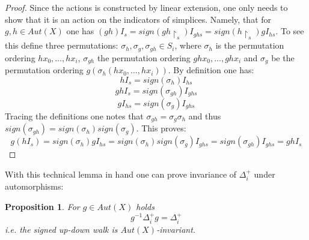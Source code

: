 \documentclass[11pt]{amsart}
\newtheorem{proposition}[theorem]{Proposition}
\begin{document}
    \begin{proof}
        Since the actions is constructed by linear extension, one only needs to show that it is an action on the indicators of simplices. Namely, that for $g,h\in Aut(X)$ one has $(gh)I_s=sign(gh\restriction_s)I_{ghs}=sign(h\restriction_s)gI_{hs}$. To see this define three permutations: $\sigma_h, \sigma_g, \sigma_{gh}\in S_i$, where $\sigma_h$ is the permutation ordering $hx_0,\dots,hx_i$, $\sigma_{gh}$ the permutation ordering $ghx_0,\dots,ghx_i$ and $\sigma_g$ be the permutation ordering $g(\sigma_h(hx_0,\dots,hx_i))$. By definition one has:
        \begin{equation}
            hI_s=sign(\sigma_h)I_{hs}
        \end{equation}
        \begin{equation}
            ghI_s=sign(\sigma_{gh})I_{ghs}
        \end{equation}
        \begin{equation}
            gI_{hs}=sign(\sigma_g)I_{ghs}
        \end{equation}
        Tracing the definitions one notes that $\sigma_{gh}=\sigma_g\sigma_h$ and thus $sign(\sigma_{gh})=sign(\sigma_h)sign(\sigma_g)$. This proves:
        \begin{equation}
            g(hI_s)=sign(\sigma_h)gI_{hs}=sign(\sigma_h)sign(\sigma_g)I_{ghs}=sign(\sigma_{gh}) I_{ghs}=ghI_s
        \end{equation}
    \end{proof}
    With this technical lemma in hand one can prove invariance of $\Delta_i^+$ under automorphisms:
    \begin{proposition}
        For $g\in Aut(X)$ holds 
        \begin{equation}
            g^{-1}\Delta_i^+g=\Delta_{i}^+
        \end{equation}
        i.e. the signed up-down walk is $Aut(X)$-invariant. 
    \end{proposition}
\end{document}
